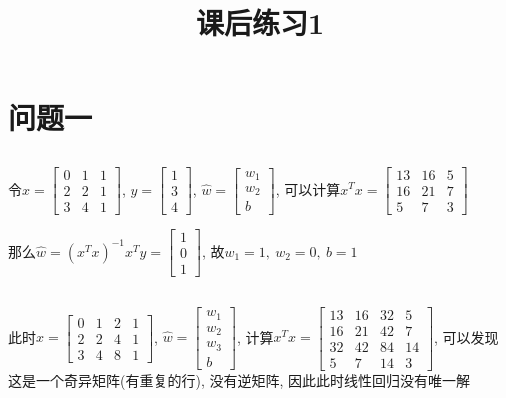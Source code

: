 \documentclass[12pt, a4paper]{article}
\title{课后练习1}
\author{}
\date{}
\begin{document}
\maketitle %

\section{问题一}

\subsection{}

令$x = \begin{bmatrix}
    0 & 1 & 1 \\
    2 & 2 & 1 \\
    3 & 4 & 1
\end{bmatrix}$, $y = \begin{bmatrix}
    1 \\ 3 \\ 4
\end{bmatrix}$, $\hat{w} = \begin{bmatrix}
    w_1 \\ w_2 \\ b
\end{bmatrix}$, 可以计算$x^T x = \begin{bmatrix}
    13 & 16 & 5\\
    16 & 21 & 7 \\
    5 & 7 & 3
\end{bmatrix}$


那么$\hat{w} = (x^T x)^{-1}x^T y = \begin{bmatrix}
    1 \\
    0 \\
    1
\end{bmatrix}$, 故$w_1 = 1, \ w_2 = 0, \ b = 1$

\subsection{}

此时$x = \begin{bmatrix}
    0&1&2&1\\
    2&2&4&1\\
    3&4&8&1
\end{bmatrix}$, $\hat{w} = \begin{bmatrix}
    w_1\\w_2\\w_3\\b
\end{bmatrix}$, 计算$x^Tx = \begin{bmatrix}
    13&16&32&5\\
    16&21&42&7\\
    32&42&84&14\\
    5&7&14&3
\end{bmatrix}$, 可以发现这是一个奇异矩阵(有重复的行), 没有逆矩阵, 因此此时线性回归没有唯一解
\end{document}
